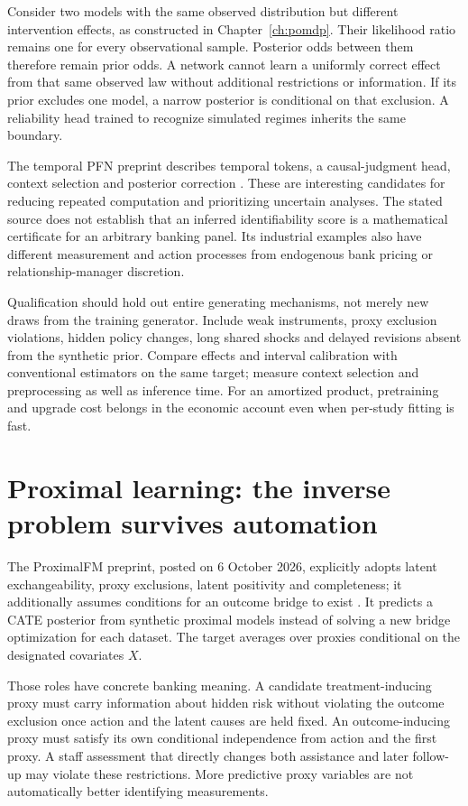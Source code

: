 Consider two models with the same observed distribution but different
intervention effects, as constructed in Chapter~\ref{ch:pomdp}.
Their likelihood ratio remains one for every observational sample.
Posterior odds between them therefore remain prior odds. A network cannot
learn a uniformly correct effect from that same observed law without
additional restrictions or information. If its prior excludes one model,
a narrow posterior is conditional on that exclusion. A reliability head
trained to recognize simulated regimes inherits the same boundary.

The temporal PFN preprint describes temporal tokens, a causal-judgment
head, context selection and posterior correction \citep{panelpfn2026}.
These are interesting candidates for reducing repeated computation and
prioritizing uncertain analyses. The stated source does not establish that
an inferred identifiability score is a mathematical certificate for an
arbitrary banking panel. Its industrial examples also have different
measurement and action processes from endogenous bank pricing or
relationship-manager discretion.

Qualification should hold out entire generating mechanisms, not merely
new draws from the training generator. Include weak instruments, proxy
exclusion violations, hidden policy changes, long shared shocks and
delayed revisions absent from the synthetic prior. Compare effects and
interval calibration with conventional estimators on the same target;
measure context selection and preprocessing as well as inference time.
For an amortized product, pretraining and upgrade cost belongs in the
economic account even when per-study fitting is fast.

\section{Proximal learning: the inverse problem survives automation}
The ProximalFM preprint, posted on 6 October 2026, explicitly adopts
latent exchangeability, proxy exclusions, latent positivity and
completeness; it additionally assumes conditions for an outcome bridge
to exist \citep[Sections 2.1--2.2]{proximalfm2026}. It predicts a CATE
posterior from synthetic proximal models instead of solving a new bridge
optimization for each dataset. The target averages over proxies
conditional on the designated covariates $X$.

Those roles have concrete banking meaning. A candidate treatment-inducing
proxy must carry information about hidden risk without violating the
outcome exclusion once action and the latent causes are held fixed.
An outcome-inducing proxy must satisfy its own conditional independence
from action and the first proxy. A staff assessment that directly changes
both assistance and later follow-up may violate these restrictions.
More predictive proxy variables are not automatically better identifying
measurements.

